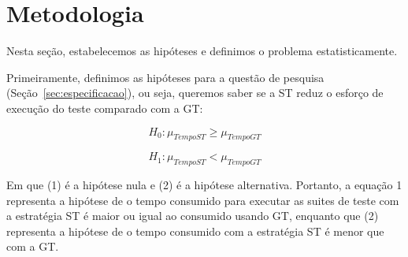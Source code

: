 \section{Metodologia}
\label{sec:metodologia}




Nesta seção, estabelecemos as hipóteses e definimos o problema estatisticamente.

Primeiramente, definimos as hipóteses para a questão de pesquisa (Seção~\ref{sec:especificacao}), ou seja, queremos saber se a ST reduz o esforço de execução do teste comparado com a GT:

\begin{equation}
	H_{0} : \mu_{TempoST} \geq \mu_{TempoGT}
\end{equation}

\begin{equation}
	H_{1} : \mu_{TempoST} < \mu_{TempoGT}
\end{equation}

Em que (1) é a hipótese nula e (2) é a hipótese alternativa. Portanto, a equação 1 representa a hipótese de o tempo consumido para executar as suites de teste com a estratégia ST é maior ou igual ao consumido usando GT, enquanto que (2) representa a hipótese de o tempo consumido com a estratégia ST é menor que com a GT.




